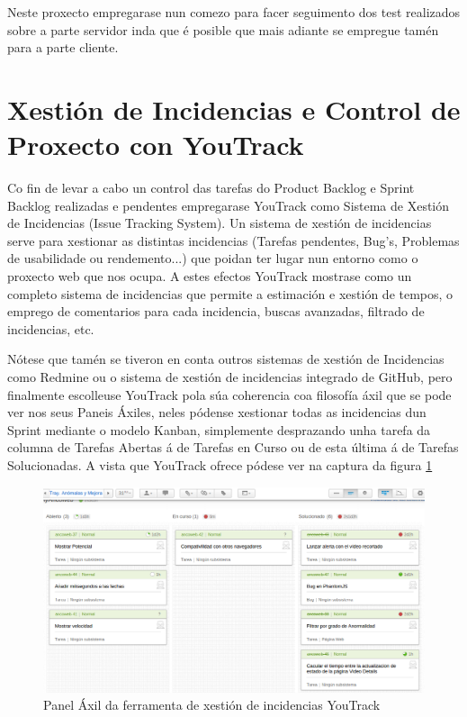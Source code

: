     Neste proxecto empregarase nun comezo para facer seguimento dos test realizados sobre a parte 
    servidor inda que é posible que mais adiante se empregue tamén para a parte cliente.

\section{Xestión de Incidencias e Control de Proxecto con YouTrack}
    Co fin de levar a cabo un control das tarefas do Product Backlog e Sprint Backlog realizadas e 
    pendentes empregarase YouTrack como Sistema de Xestión de Incidencias (Issue Tracking System). 
    Un sistema de xestión de incidencias serve para xestionar as distintas incidencias (Tarefas 
    pendentes, Bug's, Problemas de usabilidade ou rendemento...) que poidan ter lugar nun entorno 
    como o proxecto web que nos ocupa. A estes efectos YouTrack mostrase como un completo sistema 
    de incidencias que permite a estimación e xestión de tempos, o emprego de comentarios para cada
    incidencia, buscas avanzadas, filtrado de incidencias, etc.
    
    Nótese que tamén se tiveron en conta outros sistemas de xestión de Incidencias como Redmine ou
    o sistema de xestión de incidencias integrado de GitHub, pero finalmente escolleuse YouTrack 
    pola súa coherencia coa filosofía áxil que se pode ver nos seus Paneis Áxiles, neles pódense
    xestionar todas as incidencias dun Sprint mediante o modelo Kanban, simplemente desprazando unha
    tarefa da columna de Tarefas Abertas á de Tarefas en Curso ou de esta última á de Tarefas 
    Solucionadas. A vista que YouTrack ofrece pódese ver na captura da figura \ref{fig:AgilePanel}
    
    \begin{figure}[htp]
    \begin{center}
        \includegraphics[scale=0.4]{figures/AgilePanel.png}
        \caption{Panel Áxil da ferramenta de xestión de incidencias YouTrack}
    \label{fig:AgilePanel}
    \end{center}
    \end{figure}
    
    
    

